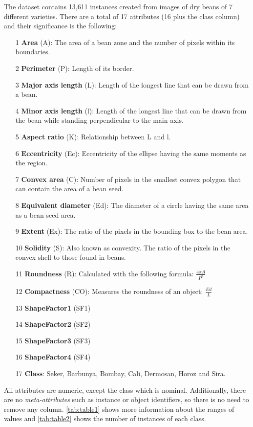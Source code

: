 \documentclass[a4paper,11pt]{article}
\begin{document}
The dataset contains 13,611 instances created from images of dry beans of 7 different varieties. There are a total of 17 attributes (16 plus the class column) and their significance is the following:

\begin{itemize}
\setlength\itemsep{-1ex}
\item[1] \textbf{Area} (A): The area of a bean zone and the number of pixels within its boundaries.
\item[2] \textbf{Perimeter} (P): Length of its border.
\item[3] \textbf{Major axis length} (L): Length of the longest line that can be drawn from a bean.
\item[4] \textbf{Minor axis length} (l): Length of the longest line that can be drawn from the bean while standing perpendicular to the main axis.
\item[5] \textbf{Aspect ratio} (K): Relationship between L and l.
\item[6] \textbf{Eccentricity} (Ec): Eccentricity of the ellipse having the same moments as the region.
\item[7] \textbf{Convex area} (C): Number of pixels in the smallest convex polygon that can contain the area of a bean seed.
\item[8] \textbf{Equivalent diameter} (Ed): The diameter of a circle having the same area as a bean seed area.
\item[9] \textbf{Extent} (Ex): The ratio of the pixels in the bounding box to the bean area.
\item[10] \textbf{Solidity} (S): Also known as convexity. The ratio of the pixels in the convex shell to those found in beans.
\item[11] \textbf{Roundness} (R): Calculated with the following formula: $\frac{4\pi A}{P^2}$
\item[12] \textbf{Compactness} (CO): Measures the roundness of an object: $\frac{Ed}{L}$
\item[13] \textbf{ShapeFactor1} (SF1)
\item[14] \textbf{ShapeFactor2} (SF2)
\item[15] \textbf{ShapeFactor3} (SF3)
\item[16] \textbf{ShapeFactor4} (SF4)
\item[17] \textbf{Class}: Seker, Barbunya, Bombay, Cali, Dermosan, Horoz and Sira.
\end{itemize}

All attributes are numeric, except the class which is nominal. Additionally, there are no \textit{meta-attributes} such as instance or object identifiers, so there is no need to remove any column. \autoref{tab:table1} shows more information about the ranges of values and \autoref{tab:table2} shows the number of instances of each class.
\end{document}
